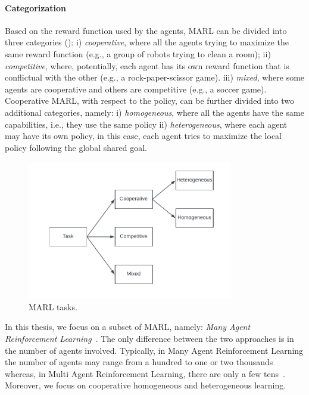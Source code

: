 \documentclass[12pt,a4paper,openright,twoside]{book}
\begin{document}
\paragraph{Categorization}

Based on the reward function used by the agents, MARL can be divided into three categories (): 
    i) \emph{cooperative}, where all the agents trying to maximize the same reward function (e.g., a group of robots
    trying to clean a room); 
    ii) \emph{competitive}, where, potentially, each agent has its own reward function that is conflictual with the other (e.g., a rock-paper-scissor game). 
    iii) \emph{mixed}, where some agents are cooperative and others are competitive (e.g., a soccer game).
    Cooperative MARL, with respect to the policy, can be further divided into two additional categories, namely: 
    i) \emph{homogeneous}, where all the agents have the same capabilities, i.e., they use the same policy 
    ii) \emph{heterogeneous}, where each agent may have its own policy, in this case, each agent tries to maximize the local policy following the global shared goal.

\begin{figure}[t]
    \centering
    \includegraphics[width=0.8\textwidth]{figures/MARL-tasks.pdf}
    \caption{MARL tasks.}
    \label{fig:marl-tasks}
\end{figure}

In this thesis, we focus on a subset of MARL, namely: \emph{Many Agent Reinforcement Learning}~\cite{yang2021many}. The only
    difference between the two approaches is in the number of agents involved. 
    Typically, in Many Agent Reinforcement Learning the number of agents may range from a hundred to one or two
    thousands whereas, in Multi Agent Reinforcement Learning, there are only a few tens~\cite{smac,marl-curricula}.
    Moreover, we focus on cooperative homogeneous and heterogeneous learning.
\end{document}
